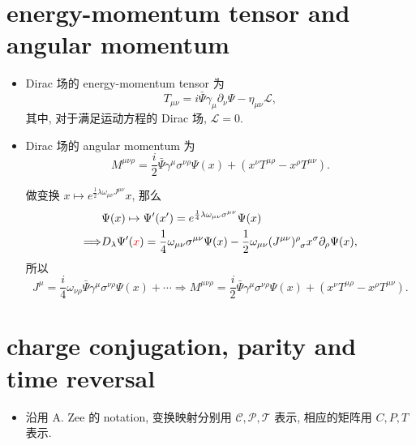 \section{energy-momentum tensor and angular momentum}
\begin{itemize}
	\item Dirac 场的 energy-momentum tensor 为
	\begin{equation} \label{7.4.1}
		T_{\mu \nu} = i \bar{\Psi} \gamma_\mu \partial_\nu \Psi - \eta_{\mu \nu} \mathcal{L},
	\end{equation}
	其中, 对于满足运动方程的 Dirac 场, $\mathcal{L} = 0$.
	
	\item  Dirac 场的 angular momentum 为
	\begin{equation} \label{7.4.2}
		M^{\mu \nu \rho} = \frac{i}{2} \bar{\Psi} \gamma^\mu \sigma^{\nu \rho} \Psi(x) + (x^\nu T^{\mu \rho} - x^\rho T^{\mu \nu}).
	\end{equation}
	
	\begin{tcolorbox}[title=calculation:]
		做变换 $x \mapsto e^{\frac{1}{2} \lambda \omega_{\mu \nu} J^{\mu \nu}} x$, 那么
		\begin{align}
			& \Psi(x) \mapsto \Psi'(x') = e^{\frac{1}{4} \lambda \omega_{\mu \nu} \sigma^{\mu \nu}} \Psi(x) \notag \\
			\Longrightarrow & D_\lambda \Psi'(\mathcolor{red}{x}) = \frac{1}{4} \omega_{\mu \nu} \sigma^{\mu \nu} \Psi(x) - \frac{1}{2} \omega_{\mu \nu} \tensor{(J^{\mu \nu})}{^\rho_\sigma} x^\sigma \partial_\rho \Psi(x),
		\end{align}
		所以
		\begin{equation}
			J^\mu = \frac{i}{4} \omega_{\nu \rho} \bar{\Psi} \gamma^\mu \sigma^{\nu \rho} \Psi(x) + \cdots \Longrightarrow M^{\mu \nu \rho} = \frac{i}{2} \bar{\Psi} \gamma^\mu \sigma^{\nu \rho} \Psi(x) + (x^\nu T^{\mu \rho} - x^\rho T^{\mu \nu}).
		\end{equation}
	\end{tcolorbox}
\end{itemize}

\section{charge conjugation, parity and time reversal}
\begin{itemize}
	\item 沿用 A. Zee 的 notation, 变换映射分别用 $\mathcal{C}, \mathcal{P}, \mathcal{T}$ 表示, 相应的矩阵用 $C, P, T$ 表示.
\end{itemize}


